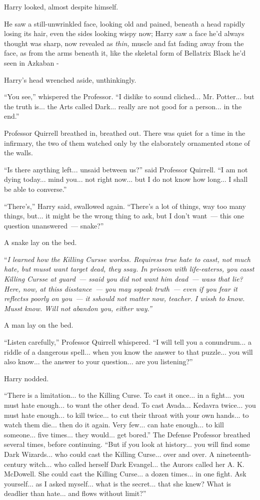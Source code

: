 Harry looked, almost despite himself.

He saw a still-unwrinkled face, looking old and pained, beneath a head rapidly losing its hair, even the sides looking wispy now; Harry saw a face he'd always thought was sharp, now revealed as \emph{thin,} muscle and fat fading away from the face, as from the arms beneath it, like the skeletal form of Bellatrix Black he'd seen in Azkaban -

Harry's head wrenched aside, unthinkingly.

``You see,'' whispered the Professor. ``I dislike to sound cliched... Mr. Potter... but the truth is... the Arts called Dark... really are not good for a person... in the end.''

Professor Quirrell breathed in, breathed out. There was quiet for a time in the infirmary, the two of them watched only by the elaborately ornamented stone of the walls.

``Is there anything left... unsaid between us?'' said Professor Quirrell. ``I am not dying today... mind you... not right now... but I do not know how long... I shall be able to converse.''

``There's,'' Harry said, swallowed again. ``There's a lot of things, way too many things, but... it might be the wrong thing to ask, but I don't want~--- this one question unanswered~--- snake?''

A snake lay on the bed.

``\emph{I learned how the Killing Cursse workss. Requiress true hate to casst, not much hate, but musst want target dead, they ssay. In prisson with life-eaterss, you casst Killing Cursse at guard~--- ssaid you did not want him dead~--- wass that lie? Here, now, at thiss disstance~--- you may sspeak truth~--- even if you fear it reflectss poorly on you~--- it sshould not matter now, teacher. I wissh to know. Musst know. Will not abandon you, either way.''}

A man lay on the bed.

``Listen carefully,'' Professor Quirrell whispered. ``I will tell you a conundrum... a riddle of a dangerous spell... when you know the answer to that puzzle... you will also know... the answer to your question... are you listening?''

Harry nodded.

``There is a limitation... to the Killing Curse. To cast it once... in a fight... you must hate enough... to want the other dead. To cast Avada... Kedavra twice... you must hate enough... to kill twice... to cut their throat with your own hands... to watch them die... then do it again. Very few... can hate enough... to kill someone... five times... they would... get bored.'' The Defense Professor breathed several times, before continuing. ``But if you look at history... you will find some Dark Wizards... who could cast the Killing Curse... over and over. A nineteenth-century witch... who called herself Dark Evangel... the Aurors called her A. K. McDowell. She could cast the Killing Curse... a dozen times... in one fight. Ask yourself... as I asked myself... what is the secret... that she knew? What is deadlier than hate... and flows without limit?''

